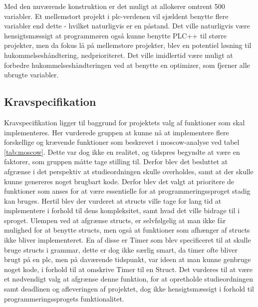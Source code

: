 \noindent Med den nuværende konstruktion er det muligt at allokerer omtrent 500 variabler. Et mellemstort projekt i \gls{plc}-verdenen vil sjældent benytte flere variabler end dette - hvilket naturligvis er en påstand. Det ville naturligvis være hensigtsmæssigt at programmøren også kunne benytte PLC++ til større projekter, men da fokus lå på mellemstore projekter, blev en potentiel løsning til hukommelseshåndtering, nedprioriteret.  
Det ville imidlertid være muligt at forbedre hukommelseshåndteringen ved at benytte en optimizer, som fjerner alle ubrugte variabler.   

\subsection*{Kravspecifikation}
Kravspecifikation ligger til baggrund for projektets valg af funktioner som skal implementeres.
Her vurderede gruppen at kunne nå at implementere flere forskellige og krævende funktioner som beskrevet i \gls{moscow}-analyse ved tabel \ref{tab:moscow}.
Dette var dog ikke en realitet, og tidspres begyndte at være en faktorer, som gruppen måtte tage stilling til.
Derfor blev det besluttet at afgrænse i det perspektiv at studieordningen skulle overholdes, samt at der skulle kunne genereres noget brugbart kode.
Derfor blev det valgt at prioritere de funktioner som anses for at være essentielle for at programmeringssproget stadig kan bruges. Hertil blev der vurderet at structs ville tage for lang tid at implementere i forhold til dens kompleksitet, samt hvad det ville bidrage til i sproget.
Ulempen ved at afgrænse structs, er selvfølgelig at man ikke får mulighed for at benytte structs, men også at funktioner som afhænger af structs ikke bliver implementeret.
En af disse er Timer som blev specificeret til at skulle bruge structs i grammar, dette er dog ikke særlig smart, da timer ofte bliver brugt på en \gls{plc}, men på daværende tidspunkt, var ideen at man kunne genbruge noget kode, i forhold til at omskrive Timer til en Struct.
Det vurderes til at være et nødvendigt valg at afgrænse denne funktion, for at opretholde studieordningen samt deadlinen og afleveringen af projektet, dog ikke hensigtsmæssigt i forhold til programmeringssprogets funktionalitet.\\

